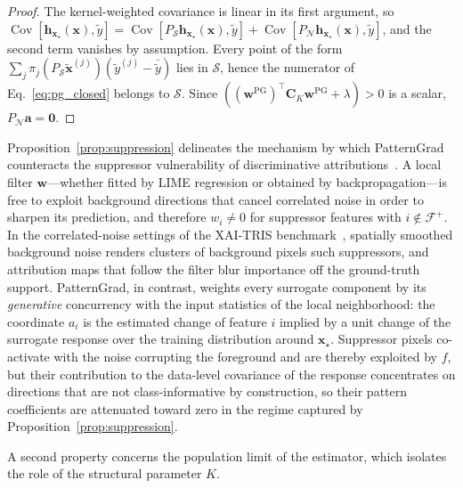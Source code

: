 \documentclass[pdflatex,sn-mathphys-num]{sn-jnl}
\theoremstyle{thmstyleone}
\theoremstyle{thmstyletwo}%
\theoremstyle{thmstylethree}%
\begin{document}
\begin{proof}
The kernel-weighted covariance is linear in its first argument, so $\operatorname{Cov}[\mathbf{h}_{\mathbf{x}_\star}(\mathbf{x}), \tilde{y}] = \operatorname{Cov}[P_{\mathcal{S}}\mathbf{h}_{\mathbf{x}_\star}(\mathbf{x}), \tilde{y}] + \operatorname{Cov}[P_{\mathcal{N}}\mathbf{h}_{\mathbf{x}_\star}(\mathbf{x}), \tilde{y}]$, and the second term vanishes by assumption. Every point of the form $\sum_j \pi_j (P_{\mathcal{S}}\tilde{\mathbf{x}}^{(j)}) (\tilde{y}^{(j)} - \bar{\tilde{y}})$ lies in $\mathcal{S}$, hence the numerator of Eq.~\eqref{eq:pg_closed} belongs to $\mathcal{S}$. Since $((\mathbf{w}^{\text{PG}})^\top \mathbf{C}_K \mathbf{w}^{\text{PG}} + \lambda) > 0$ is a scalar, $P_{\mathcal{N}}\mathbf{a} = \mathbf{0}$.
\end{proof}

Proposition~\ref{prop:suppression} delineates the mechanism by which PatternGrad counteracts the suppressor vulnerability of discriminative attributions~\cite{haufe2014, wilming2022}. A local filter $\mathbf{w}$---whether fitted by LIME regression or obtained by backpropagation---is free to exploit background directions that cancel correlated noise in order to sharpen its prediction, and therefore $w_i \neq 0$ for suppressor features with $i \notin \mathcal{F}^+$. In the correlated-noise settings of the XAI-TRIS benchmark~\cite{clark2024}, spatially smoothed background noise renders clusters of background pixels such suppressors, and attribution maps that follow the filter blur importance off the ground-truth support. PatternGrad, in contrast, weights every surrogate component by its \emph{generative} concurrency with the input statistics of the local neighborhood: the coordinate $a_i$ is the estimated change of feature $i$ implied by a unit change of the surrogate response over the training distribution around $\mathbf{x}_\star$. Suppressor pixels co-activate with the noise corrupting the foreground and are thereby exploited by $f$, but their contribution to the data-level covariance of the response concentrates on directions that are not class-informative by construction, so their pattern coefficients are attenuated toward zero in the regime captured by Proposition~\ref{prop:suppression}.

A second property concerns the population limit of the estimator, which isolates the role of the structural parameter $K$.
\end{document}
